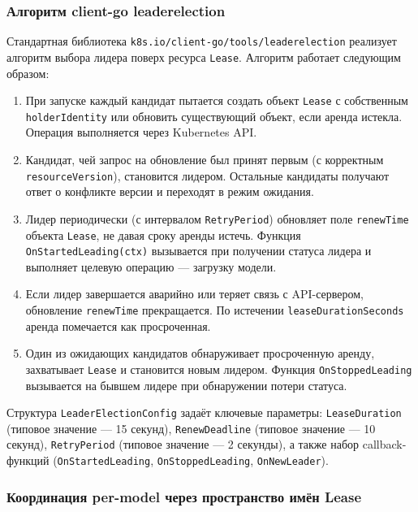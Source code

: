 \subsubsection{Алгоритм client-go leaderelection}

Стандартная библиотека \texttt{k8s.io/client-go/tools/leaderelection} реализует алгоритм выбора лидера поверх ресурса \texttt{Lease}. Алгоритм работает следующим образом:

\begin{enumerate}[leftmargin=*]
  \item При запуске каждый кандидат пытается создать объект \texttt{Lease} с собственным \texttt{holderIdentity} или обновить существующий объект, если аренда истекла. Операция выполняется через Kubernetes API.
  \item Кандидат, чей запрос на обновление был принят первым (с корректным \texttt{resourceVersion}), становится лидером. Остальные кандидаты получают ответ о конфликте версии и переходят в режим ожидания.
  \item Лидер периодически (с интервалом \texttt{RetryPeriod}) обновляет поле \texttt{renewTime} объекта \texttt{Lease}, не давая сроку аренды истечь. Функция \texttt{OnStartedLeading(ctx)} вызывается при получении статуса лидера и выполняет целевую операцию --- загрузку модели.
  \item Если лидер завершается аварийно или теряет связь с API-сервером, обновление \texttt{renewTime} прекращается. По истечении \texttt{leaseDurationSeconds} аренда помечается как просроченная.
  \item Один из ожидающих кандидатов обнаруживает просроченную аренду, захватывает \texttt{Lease} и становится новым лидером. Функция \texttt{OnStoppedLeading} вызывается на бывшем лидере при обнаружении потери статуса.
\end{enumerate}

Структура \texttt{LeaderElectionConfig} задаёт ключевые параметры: \texttt{LeaseDuration} (типовое значение --- 15 секунд), \texttt{RenewDeadline} (типовое значение --- 10 секунд), \texttt{RetryPeriod} (типовое значение --- 2 секунды), а также набор callback-функций (\texttt{OnStartedLeading}, \texttt{OnStoppedLeading}, \texttt{OnNewLeader}).

\subsubsection{Координация per-model через пространство имён Lease}

